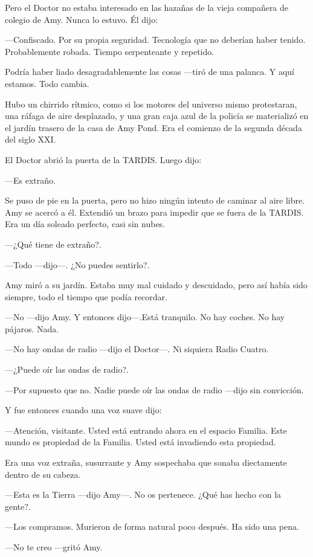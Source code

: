 Pero el Doctor no estaba interesado en las hazañas de la vieja compañera de colegio de Amy. Nunca lo estuvo. Él dijo:

---Confiscado. Por su propia seguridad. Tecnología que no deberían haber tenido. Probablemente robada. Tiempo serpenteante y repetido.

Podría haber liado desagradablemente las cosas ---tiró de una palanca. Y aquí estamos. Todo cambia.

Hubo un chirrido rítmico, como si los motores del universo mismo protestaran, una ráfaga de aire desplazado, y una gran caja azul de la policía se materializó en el jardín trasero de la casa de Amy Pond. Era el comienzo de la segunda década del siglo XXI.

El Doctor abrió la puerta de la TARDIS. Luego dijo:

---Es extraño.

Se puso de pie en la puerta, pero no hizo ningún intento de caminar al aire libre. Amy se acercó a él. Extendió un brazo para impedir que se fuera de la TARDIS. Era un día soleado perfecto, casi sin nubes.

---¿Qué tiene de extraño?.

---Todo ---dijo---. ¿No puedes sentirlo?.

Amy miró a su jardín. Estaba muy mal cuidado y descuidado, pero así había sido siempre, todo el tiempo que podía recordar.

---No ---dijo Amy. Y entonces dijo---.Está tranquilo. No hay coches. No hay pájaros. Nada.

---No hay ondas de radio ---dijo el Doctor---. Ni siquiera Radio Cuatro.

---¿Puede oír las ondas de radio?.

---Por supuesto que no. Nadie puede oír las ondas de radio ---dijo sin convicción.

Y fue entonces cuando una voz suave dijo:

---Atención, visitante. Usted está entrando ahora en el espacio Familia. Este mundo es propiedad de la Familia. Usted está invadiendo esta propiedad.

Era una voz extraña, susurrante y Amy sospechaba que sonaba diectamente dentro de su cabeza.

---Esta es la Tierra ---dijo Amy---. No os pertenece. ¿Qué has hecho con la gente?.

---Los compramos. Murieron de forma natural poco después. Ha sido una pena.

---No te creo ---gritó Amy.

